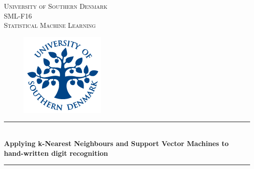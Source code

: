 \documentclass[11pt,twoside]{article}
\begin{document}
\begin{titlepage}
\newcommand{\HRule}{\rule{\linewidth}{0.5mm}} %

\center %
 

\textsc{\LARGE University of Southern Denmark}\\[1cm] %
\textsc{\Large SML-F16}\\[0.3cm] %
\textsc{\large Statistical Machine Learning }\\[0.3cm] %
\vspace{0.5cm}
\begin{figure}[H]
\centering
\includegraphics[scale=1]{img/sdu-segl.png}
\end{figure}
\vspace{0.4cm}

\HRule \\[0.4cm]
{ \huge \bfseries Applying k-Nearest Neighbours and Support Vector Machines to hand-written digit recognition}\\[0.4cm] %
\HRule \\[2.5cm]
 


\end{titlepage}
\end{document}
